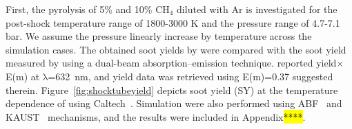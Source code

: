 First, the pyrolysis of 5\% and 10\% $\mathrm{CH_4}$ diluted with Ar is investigated for the post-shock temperature range of 1800-3000 K and the pressure range of 4.7-7.1 bar. We assume the pressure linearly increase by temperature across the simulation cases. The obtained soot yields by were compared with the soot yield measured by \citet{agafonov2016unified} using a dual-beam absorption–emission technique. \citet{agafonov2016unified} reported yield$\times$E(m) at $\mathrm{\lambda}$=632~nm, and yield data was retrieved using E(m)=0.37 suggested therein. Figure~\ref{fig:shocktubeyield} depicts soot yield (SY) at the temperature dependence of  using Caltech~\citep{blanquart2009chemical}. Simulation were also performed using ABF~\citep{appel2000kinetic} and KAUST~\cite{wang2013pah} mechanisms, and the results were included in Appendix\hl{****}.


